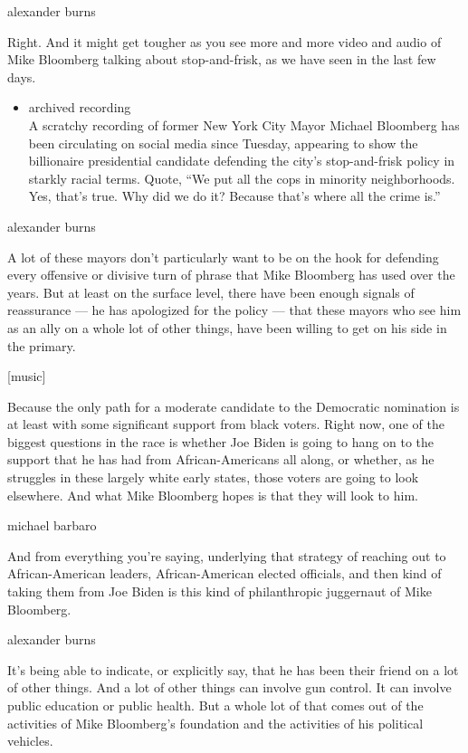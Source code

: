 alexander burns

Right. And it might get tougher as you see more and more video and audio
of Mike Bloomberg talking about stop-and-frisk, as we have seen in the
last few days.

\begin{itemize}
\tightlist
\item
  archived recording\\
  A scratchy recording of former New York City Mayor Michael Bloomberg
  has been circulating on social media since Tuesday, appearing to show
  the billionaire presidential candidate defending the city's
  stop-and-frisk policy in starkly racial terms. Quote, ``We put all the
  cops in minority neighborhoods. Yes, that's true. Why did we do it?
  Because that's where all the crime is.''
\end{itemize}

alexander burns

A lot of these mayors don't particularly want to be on the hook for
defending every offensive or divisive turn of phrase that Mike Bloomberg
has used over the years. But at least on the surface level, there have
been enough signals of reassurance --- he has apologized for the policy
--- that these mayors who see him as an ally on a whole lot of other
things, have been willing to get on his side in the primary.

{[}music{]}

Because the only path for a moderate candidate to the Democratic
nomination is at least with some significant support from black voters.
Right now, one of the biggest questions in the race is whether Joe Biden
is going to hang on to the support that he has had from
African-Americans all along, or whether, as he struggles in these
largely white early states, those voters are going to look elsewhere.
And what Mike Bloomberg hopes is that they will look to him.

michael barbaro

And from everything you're saying, underlying that strategy of reaching
out to African-American leaders, African-American elected officials, and
then kind of taking them from Joe Biden is this kind of philanthropic
juggernaut of Mike Bloomberg.

alexander burns

It's being able to indicate, or explicitly say, that he has been their
friend on a lot of other things. And a lot of other things can involve
gun control. It can involve public education or public health. But a
whole lot of that comes out of the activities of Mike Bloomberg's
foundation and the activities of his political vehicles.

